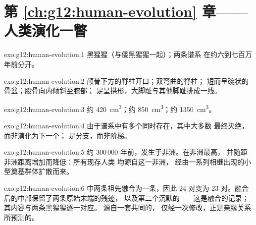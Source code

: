 \section*{第 \ref{ch:g12:human-evolution} 章——人类演化一瞥}

\begin{solution}{exo:g12:human-evolution:1}
黑猩猩（与倭黑猩猩一起）；两条谱系
在约六到七百万年前分开。
\end{solution}

\begin{solution}{exo:g12:human-evolution:2}
颅骨下方的脊柱开口；双弯曲的脊柱；
短而呈碗状的骨盆；股骨向内倾斜至膝部；
足呈拱形，大脚趾与其他脚趾排成一线。
\end{solution}

\begin{solution}{exo:g12:human-evolution:3}
约 \qty{420}{cm^3}；约 \qty{850}{cm^3}；约 \qty{1350}{cm^3}。
\end{solution}

\begin{solution}{exo:g12:human-evolution:4}
由于谱系中有多个同时存在，其中大多数
最终灭绝，而非演化为下一个；
是分支，而非阶梯。
\end{solution}

\begin{solution}{exo:g12:human-evolution:5}
约 300\,000 年前，发生于非洲。在非洲最高，
并随距非洲距离增加而降低：所有现存人类
均源自这一非洲，
经由一系列相继出现的小型奠基群体扩散而来。
\end{solution}

\begin{solution}{exo:g12:human-evolution:6}
中两条祖先融合为一条，因此
24 对变为 23 对。融合后的中部保留了两条原始末端的残迹，
以及第二个沉默的——这是融合的记录；
其内容与两条黑猩猩逐一对应。
源自一套共同的，
仅经一次修改，正是亲缘关系所预测的。
\end{solution}

